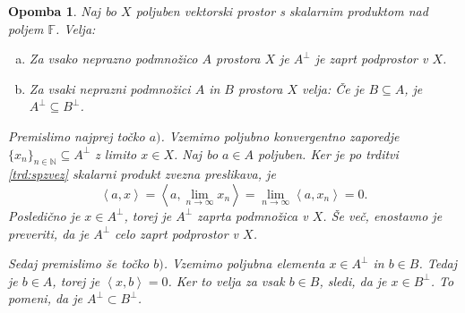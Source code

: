 \documentclass[12pt,a4paper,oneside,fleqn,openany]{book}
\newtheorem{opomba}[izrek]{Opomba}
\newcommand{\F}{\mathbb{F}}
\newcommand{\N}{\mathbb{N}}
\newcommand{\Sp}[2]{\ensuremath{\left<#1, #2\right>}}
\begin{document}
\begin{opomba}
	\label{opomb:zaprtortogkompl}
	Naj bo $X$ poljuben vektorski prostor s skalarnim produktom nad poljem $\F$. Velja: \begin{enumerate}[a)]
		\item  Za vsako neprazno podmnožico $A$ prostora $X$ je $A^\bot$ je zaprt podprostor v $X$. 
		\item Za vsaki neprazni podmnožici $A$ in $B$ prostora $X$ velja: Če je $B\subseteq A$, je $A^\bot\subseteq B^\bot$.
	\end{enumerate}
	Premislimo najprej točko $a)$. Vzemimo poljubno konvergentno zaporedje $\{x_n\}_{n\in\N}\subseteq A^\bot$ z limito $x\in X$. Naj bo $a\in A$ poljuben. Ker je po trditvi \ref{trd:spzvez} skalarni produkt zvezna preslikava, je $$\Sp{a}{x} = \Sp{a}{\lim_{n\to \infty}x_n} = \lim_{n\to\infty}\Sp{a}{x_n} =0.$$
	Posledično je $x\in A^\bot$, torej je $A^\bot$ zaprta podmnožica v $X$. Še več, enostavno je preveriti, da je $A^\bot$ celo zaprt podprostor v $X$.
	
	Sedaj premislimo še točko $b)$. Vzemimo poljubna elementa $x\in A^\bot$ in $b\in B$. Tedaj je $b\in A$, torej je $\Sp{x}{b}=0$. Ker to velja za vsak $b\in B$, sledi, da je $x\in B^\bot$. To pomeni, da je $A^\bot\subset B^\bot$.
\end{opomba}
\end{document}
